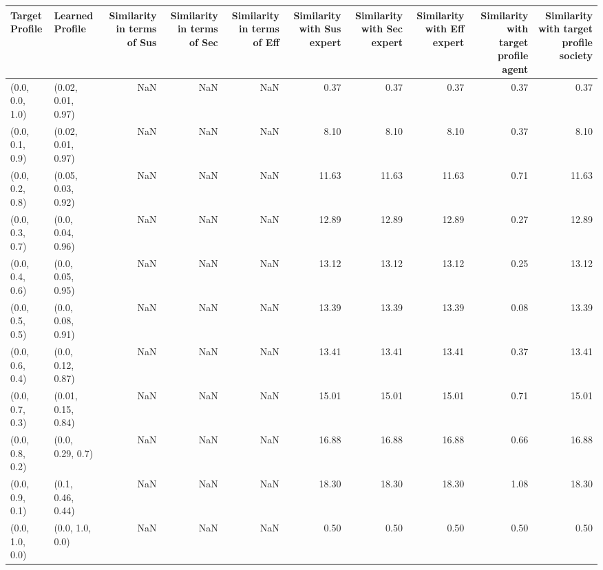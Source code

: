 \begin{tabular}{llrrrrrrrr}
\toprule
Target Profile & Learned Profile & Similarity in terms of Sus & Similarity in terms of Sec & Similarity in terms of Eff & Similarity with Sus expert & Similarity with Sec expert & Similarity with Eff expert & Similarity with target profile agent & Similarity with target profile society \\
\midrule
(0.0, 0.0, 1.0) & (0.02, 0.01, 0.97) & NaN & NaN & NaN & 0.37 & 0.37 & 0.37 & 0.37 & 0.37 \\
(0.0, 0.1, 0.9) & (0.02, 0.01, 0.97) & NaN & NaN & NaN & 8.10 & 8.10 & 8.10 & 0.37 & 8.10 \\
(0.0, 0.2, 0.8) & (0.05, 0.03, 0.92) & NaN & NaN & NaN & 11.63 & 11.63 & 11.63 & 0.71 & 11.63 \\
(0.0, 0.3, 0.7) & (0.0, 0.04, 0.96) & NaN & NaN & NaN & 12.89 & 12.89 & 12.89 & 0.27 & 12.89 \\
(0.0, 0.4, 0.6) & (0.0, 0.05, 0.95) & NaN & NaN & NaN & 13.12 & 13.12 & 13.12 & 0.25 & 13.12 \\
(0.0, 0.5, 0.5) & (0.0, 0.08, 0.91) & NaN & NaN & NaN & 13.39 & 13.39 & 13.39 & 0.08 & 13.39 \\
(0.0, 0.6, 0.4) & (0.0, 0.12, 0.87) & NaN & NaN & NaN & 13.41 & 13.41 & 13.41 & 0.37 & 13.41 \\
(0.0, 0.7, 0.3) & (0.01, 0.15, 0.84) & NaN & NaN & NaN & 15.01 & 15.01 & 15.01 & 0.71 & 15.01 \\
(0.0, 0.8, 0.2) & (0.0, 0.29, 0.7) & NaN & NaN & NaN & 16.88 & 16.88 & 16.88 & 0.66 & 16.88 \\
(0.0, 0.9, 0.1) & (0.1, 0.46, 0.44) & NaN & NaN & NaN & 18.30 & 18.30 & 18.30 & 1.08 & 18.30 \\
(0.0, 1.0, 0.0) & (0.0, 1.0, 0.0) & NaN & NaN & NaN & 0.50 & 0.50 & 0.50 & 0.50 & 0.50 \\
\bottomrule
\end{tabular}
